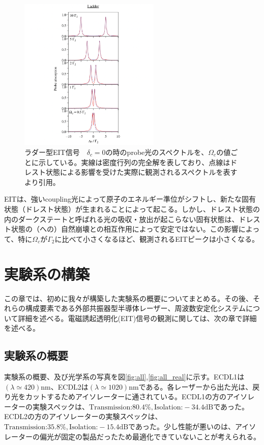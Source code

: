 \documentclass[dvipdfmx]{jsarticle}
\begin{document}
\begin{figure}[hbtp]
\centering
\includegraphics[width=0.6\textwidth]{images/eit_absorption.png}
\caption{\label{fig:absorption} ラダー型EIT信号　$\delta_c = 0$の時のprobe光のスペクトルを、$\Omega_c$の値ごとに示している。実線は密度行列の完全解を表しており、点線はドレスト状態による影響を受けた実際に観測されるスペクトルを表す　\cite{eit-absorption}より引用。}
\end{figure}

EITは、強いcoupling光によって原子のエネルギー準位がシフトし、新たな固有状態（ドレスト状態）が生まれることによって起こる。しかし、ドレスト状態の内のダークステートと呼ばれる光の吸収・放出が起こらない固有状態は、ドレスト状態の（への）自然崩壊との相互作用によって安定ではない。この影響によって、特に$\Omega_c$が$\Gamma_2$に比べて小さくなるほど、観測されるEITピークは小さくなる。

\clearpage
\section{実験系の構築}
この章では、初めに我々が構築した実験系の概要についてまとめる。その後、それらの構成要素である外部共振器型半導体レーザー、周波数安定化システムについて詳細を述べる。電磁誘起透明化(EIT)信号の観測に関しては、次の章で詳細を述べる。
\subsection{実験系の概要}
実験系の概要、及び光学系の写真を図\ref{fig:all},\ref{fig:all_real}に示す。ECDL1は$(\lambda \simeq 420)$nm、ECDL2は$(\lambda \simeq 1020)$nmである。各レーザーから出た光は、戻り光をカットするためアイソレーターに通されている。ECDL1の方のアイソレーターの実験スペックは、$\text{Transmission:} 80.4\%, \text{Isolation:} -34.4\text{dB}$であった。ECDL2の方のアイソレーターの実験スペックは、$\text{Transmission:} 35.8\%, \text{Isolation:} -15.4\text{dB}$であった。少し性能が悪いのは、アイソレーターの偏光が固定の製品だったため最適化できていないことが考えられる。
\end{document}
